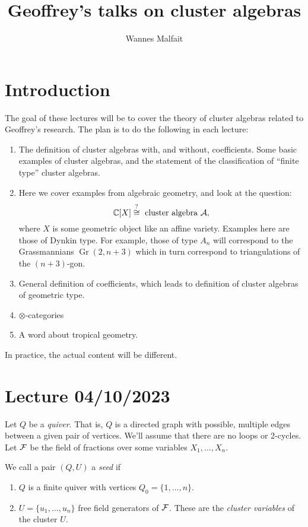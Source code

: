 \documentclass{article}
\title{Geoffrey's talks on cluster algebras}
\author{Wannes Malfait}
\DeclareMathOperator{\Gr}{Gr}
\begin{document}
\maketitle
\newpage
\tableofcontents
\newpage

\section{Introduction}

The goal of these lectures will be to cover the theory of cluster algebras related to
Geoffrey's research. The plan is to do the following in each lecture:
\begin{enumerate}
	\item The definition of cluster algebras with, and without, coefficients. Some basic examples
	      of cluster algebras, and the statement of the classification of ``finite type'' cluster
	      algebras.
	\item Here we cover examples from algebraic geometry, and look at the question:
	      \begin{equation*}
		      \mathbb{C} [X] \overset{?}{\cong} \text{ cluster algebra } \mathcal{A},
	      \end{equation*}
	      where $X$ is some geometric object like an affine variety.
	      Examples here are those of Dynkin type.
	      For example, those of type $A_n$ will correspond to the
	      Grassmannians $\Gr(2,n+3)$ which in turn correspond to triangulations of the $(n+3)$-gon.
	\item General definition of coefficients, which leads to definition of cluster algebras of
	      geometric type.
	\item $\otimes$-categories
	\item A word about tropical geometry.
\end{enumerate}

In practice, the actual content will be different.

\section{Lecture 04/10/2023}

Let $Q$ be a \emph{quiver}. That is, $Q$ is a directed graph with possible, multiple
edges between a given pair of vertices. We'll assume that there are no loops or
2-cycles. Let $\mathcal{F}$ be the field of fractions over some variables $X_1, \dots, X_n$.
\begin{definition}
	We call a pair $(Q, U)$ a \emph{seed} if
	\begin{enumerate}
		\item $Q$ is a finite quiver with vertices $Q_0 = \{1, \dots, n\}$.
		\item $U = \{u_1, \dots, u_n\}$ free field generators of $\mathcal{F}$.
		      These are the \emph{cluster variables} of the cluster $U$.
	\end{enumerate}
\end{definition}
\end{document}
